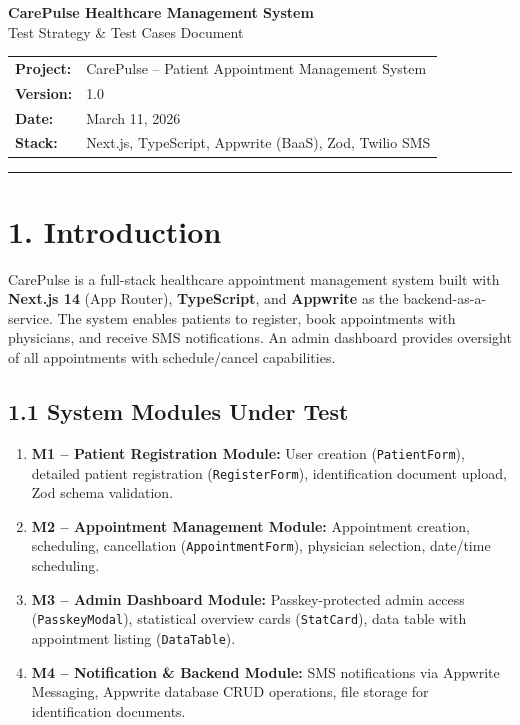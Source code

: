 \documentclass[12pt,a4paper]{article}
\begin{document}
\begin{center}
    {\LARGE \textbf{\color{headerblue}CarePulse Healthcare Management System}}\\[6pt]
    {\Large Test Strategy \& Test Cases Document}\\[12pt]
    \begin{tabular}{ll}
        \textbf{Project:}  & CarePulse -- Patient Appointment Management System \\
        \textbf{Version:}  & 1.0 \\
        \textbf{Date:}     & March 11, 2026 \\
        \textbf{Stack:}    & Next.js, TypeScript, Appwrite (BaaS), Zod, Twilio SMS \\
    \end{tabular}
\end{center}
\vspace{6pt}
\hrule
\vspace{8pt}

\section{1. Introduction}

CarePulse is a full-stack healthcare appointment management system built with \textbf{Next.js 14} (App Router), \textbf{TypeScript}, and \textbf{Appwrite} as the backend-as-a-service. The system enables patients to register, book appointments with physicians, and receive SMS notifications. An admin dashboard provides oversight of all appointments with schedule/cancel capabilities.

\subsection{1.1 System Modules Under Test}
\begin{enumerate}[leftmargin=*, noitemsep]
    \item \textbf{M1 -- Patient Registration Module:} User creation (\texttt{PatientForm}), detailed patient registration (\texttt{RegisterForm}), identification document upload, Zod schema validation.
    \item \textbf{M2 -- Appointment Management Module:} Appointment creation, scheduling, cancellation (\texttt{AppointmentForm}), physician selection, date/time scheduling.
    \item \textbf{M3 -- Admin Dashboard Module:} Passkey-protected admin access (\texttt{PasskeyModal}), statistical overview cards (\texttt{StatCard}), data table with appointment listing (\texttt{DataTable}).
    \item \textbf{M4 -- Notification \& Backend Module:} SMS notifications via Appwrite Messaging, Appwrite database CRUD operations, file storage for identification documents.
\end{enumerate}
\end{document}
